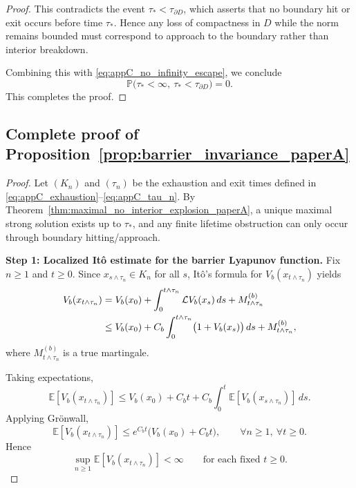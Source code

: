 \documentclass[pdflatex,sn-mathphys-ay]{sn-jnl}
\theoremstyle{thmstyleone}
\theoremstyle{definition}
\theoremstyle{remark}
\begin{document}
\begin{appendices}
\begin{proof}
This contradicts the event $\tau_*<\tau_{\partial D}$, which asserts that no
boundary hit or exit occurs before time $\tau_*$. Hence any loss of compactness
in $D$ while the norm remains bounded must correspond to approach to the
boundary rather than interior breakdown.

Combining this with \eqref{eq:appC_no_infinity_escape}, we conclude
\[
\mathbb P\bigl(\tau_*<\infty,\ \tau_*<\tau_{\partial D}\bigr)=0.
\]
This completes the proof.
\end{proof}

\subsection{Complete proof of Proposition~\ref{prop:barrier_invariance_paperA}}
\label{appC:proof_proposition_barrier}

\begin{proof}
Let \((K_n)\) and \((\tau_n)\) be the exhaustion and exit times defined in \eqref{eq:appC_exhaustion}--\eqref{eq:appC_tau_n}. By Theorem~\ref{thm:maximal_no_interior_explosion_paperA}, a unique maximal strong solution exists up to \(\tau_*\), and any finite lifetime obstruction can only occur through boundary hitting/approach.

\medskip
\noindent\textbf{Step 1: Localized It\^o estimate for the barrier Lyapunov function.}
Fix \(n\ge1\) and \(t\ge0\). Since \(x_{s\wedge \tau_n}\in K_n\) for all \(s\), It\^o's formula for \(V_b(x_{t\wedge \tau_n})\) yields
\begin{align}
V_b(x_{t\wedge \tau_n})
&=
V_b(x_0)+\int_0^{t\wedge \tau_n}\mathcal LV_b(x_s)\,ds + M_{t\wedge \tau_n}^{(b)} \notag\\
&\le
V_b(x_0)+C_b\int_0^{t\wedge \tau_n}\bigl(1+V_b(x_s)\bigr)\,ds + M_{t\wedge \tau_n}^{(b)},
\label{eq:appC_barrier_ito}
\end{align}
where \(M_{t\wedge \tau_n}^{(b)}\) is a true martingale.

Taking expectations,
\begin{equation}
\label{eq:appC_barrier_expect_pre_gronwall}
\mathbb E[V_b(x_{t\wedge \tau_n})]
\le
V_b(x_0)+C_b t + C_b\int_0^t \mathbb E[V_b(x_{s\wedge \tau_n})]\,ds.
\end{equation}
Applying Gr\"onwall,
\begin{equation}
\label{eq:appC_barrier_expect_bound}
\mathbb E[V_b(x_{t\wedge \tau_n})]
\le e^{C_b t}\bigl(V_b(x_0)+C_b t\bigr),\qquad \forall n\ge1,\ \forall t\ge0.
\end{equation}
Hence
\begin{equation}
\label{eq:appC_barrier_uniform_bound}
\sup_{n\ge1}\mathbb E[V_b(x_{t\wedge \tau_n})]<\infty\qquad \text{for each fixed }t\ge0.
\end{equation}


\end{proof}
\end{appendices}
\end{document}
